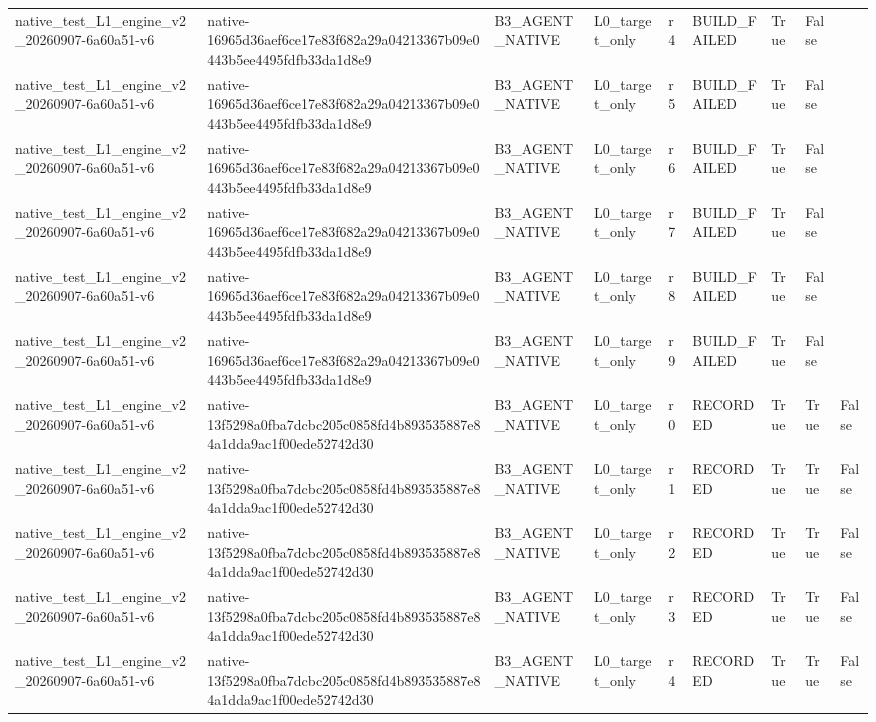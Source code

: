 \begin{tabular}{lllllllll}
native\_test\_L1\_engine\_v2\_20260907-6a60a51-v6 & native-16965d36aef6ce17e83f682a29a04213367b09e0443b5ee4495fdfb33da1d8e9 & B3\_AGENT\_NATIVE & L0\_target\_only & r4 & BUILD\_FAILED & True & False &  \\
native\_test\_L1\_engine\_v2\_20260907-6a60a51-v6 & native-16965d36aef6ce17e83f682a29a04213367b09e0443b5ee4495fdfb33da1d8e9 & B3\_AGENT\_NATIVE & L0\_target\_only & r5 & BUILD\_FAILED & True & False &  \\
native\_test\_L1\_engine\_v2\_20260907-6a60a51-v6 & native-16965d36aef6ce17e83f682a29a04213367b09e0443b5ee4495fdfb33da1d8e9 & B3\_AGENT\_NATIVE & L0\_target\_only & r6 & BUILD\_FAILED & True & False &  \\
native\_test\_L1\_engine\_v2\_20260907-6a60a51-v6 & native-16965d36aef6ce17e83f682a29a04213367b09e0443b5ee4495fdfb33da1d8e9 & B3\_AGENT\_NATIVE & L0\_target\_only & r7 & BUILD\_FAILED & True & False &  \\
native\_test\_L1\_engine\_v2\_20260907-6a60a51-v6 & native-16965d36aef6ce17e83f682a29a04213367b09e0443b5ee4495fdfb33da1d8e9 & B3\_AGENT\_NATIVE & L0\_target\_only & r8 & BUILD\_FAILED & True & False &  \\
native\_test\_L1\_engine\_v2\_20260907-6a60a51-v6 & native-16965d36aef6ce17e83f682a29a04213367b09e0443b5ee4495fdfb33da1d8e9 & B3\_AGENT\_NATIVE & L0\_target\_only & r9 & BUILD\_FAILED & True & False &  \\
native\_test\_L1\_engine\_v2\_20260907-6a60a51-v6 & native-13f5298a0fba7dcbc205c0858fd4b893535887e84a1dda9ac1f00ede52742d30 & B3\_AGENT\_NATIVE & L0\_target\_only & r0 & RECORDED & True & True & False \\
native\_test\_L1\_engine\_v2\_20260907-6a60a51-v6 & native-13f5298a0fba7dcbc205c0858fd4b893535887e84a1dda9ac1f00ede52742d30 & B3\_AGENT\_NATIVE & L0\_target\_only & r1 & RECORDED & True & True & False \\
native\_test\_L1\_engine\_v2\_20260907-6a60a51-v6 & native-13f5298a0fba7dcbc205c0858fd4b893535887e84a1dda9ac1f00ede52742d30 & B3\_AGENT\_NATIVE & L0\_target\_only & r2 & RECORDED & True & True & False \\
native\_test\_L1\_engine\_v2\_20260907-6a60a51-v6 & native-13f5298a0fba7dcbc205c0858fd4b893535887e84a1dda9ac1f00ede52742d30 & B3\_AGENT\_NATIVE & L0\_target\_only & r3 & RECORDED & True & True & False \\
native\_test\_L1\_engine\_v2\_20260907-6a60a51-v6 & native-13f5298a0fba7dcbc205c0858fd4b893535887e84a1dda9ac1f00ede52742d30 & B3\_AGENT\_NATIVE & L0\_target\_only & r4 & RECORDED & True & True & False \\

\end{tabular}
